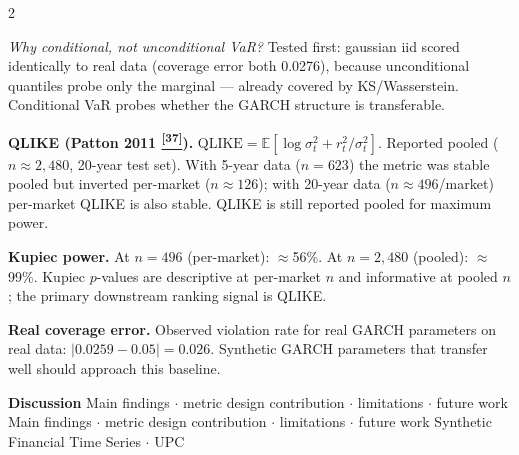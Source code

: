 \documentclass[10pt]{article}
\newcommand{\pagehead}[2]{%
  \begin{tcolorbox}[enhanced,arc=0pt,outer arc=0pt,boxrule=0pt,
    colback=Navy,colframe=Navy,
    top=5pt,bottom=5pt,left=8pt,right=8pt,
    before skip=0pt,after skip=10pt]
  {\color{white}\large\bfseries #1}%
  \ifx\relax#2\relax\else\\[1pt]{\color{blue!30!white}\small #2}\fi
  \hfill{\color{blue!20!white}\footnotesize Synthetic Financial Time Series $\cdot$ UPC}
  \end{tcolorbox}}
\newcommand{\tcite}[1]{%
  \hyperlink{R:#1}{\textsuperscript{\scriptsize\textbf{[#1]}}}}
\newcommand{\E}{\mathbb{E}}
\begin{document}
\begin{multicols}{2}
{\textit{Why conditional, not unconditional VaR?} Tested first: gaussian iid scored identically to real data (coverage error both 0.0276), because unconditional quantiles probe only the marginal --- already covered by KS/Wasserstein. Conditional VaR probes whether the GARCH structure is transferable.

\textbf{QLIKE (Patton 2011\tcite{37}).} $\text{QLIKE} = \E[\log\sigma_t^2 + r_t^2/\sigma_t^2]$. Reported pooled ($n\approx2{,}480$, 20-year test set). With 5-year data ($n=623$) the metric was stable pooled but inverted per-market ($n\approx126$); with 20-year data ($n\approx496$/market) per-market QLIKE is also stable. QLIKE is still reported pooled for maximum power.

\textbf{Kupiec power.} At $n=496$ (per-market): $\approx$56\%. At $n=2{,}480$ (pooled): $\approx$99\%. Kupiec $p$-values are descriptive at per-market $n$ and informative at pooled $n$; the primary downstream ranking signal is QLIKE.

\textbf{Real coverage error.} Observed violation rate for real GARCH parameters on real data: $|0.0259 - 0.05| = 0.026$. Synthetic GARCH parameters that transfer well should approach this baseline.}

\end{multicols}

\clearpage

\pagehead{Discussion}
         {Main findings $\cdot$ metric design contribution $\cdot$ limitations $\cdot$ future work}
\end{document}
